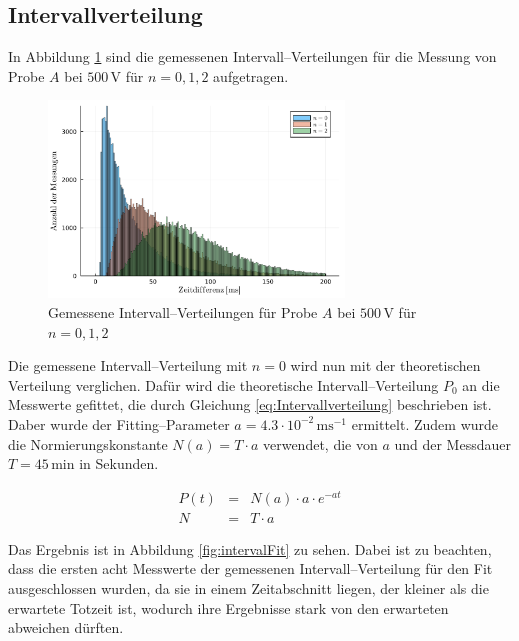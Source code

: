 \documentclass[12pt,a4paper]{scrartcl}
\numberwithin{equation}{section} %
\begin{document}
\hypertarget{intervallverteilung}{%
\subsection{Intervallverteilung}\label{intervallverteilung}}
In Abbildung \ref{fig:interval} sind die gemessenen Intervall--Verteilungen für die Messung von Probe $A$ bei $500 \mathrm{\, V}$ für $n = 0,1,2$ aufgetragen.

\begin{figure}[h]
	\centering
	\includegraphics[width=0.7\textwidth]{../media/B3.1/interval.pdf}
	\caption{Gemessene Intervall--Verteilungen für Probe $A$ bei $500 \mathrm{\, V}$ für $n = 0,1,2$}
	\label{fig:interval}
\end{figure}

Die gemessene Intervall--Verteilung mit $n = 0$ wird nun mit der theoretischen Verteilung verglichen. Dafür wird die theoretische Intervall--Verteilung $P_0$ an die Messwerte gefittet, die durch Gleichung \eqref{eq:Intervallverteilung} beschrieben ist. Daber wurde der Fitting--Parameter $a = 4.3 \cdot 10^{-2} \mathrm{\,ms^{-1}}$ ermittelt. Zudem wurde die Normierungskonstante $N(a)=T\cdot a$ verwendet, die von $a$ und der Messdauer $T=45\mathrm{\,min}$ in Sekunden.

\begin{eqnarray}
	P(t) &=& N(a) \cdot a \cdot e^{-at} \\
	N &=& T \cdot a
\end{eqnarray}

\noindent
Das Ergebnis ist in Abbildung \ref{fig:intervalFit} zu sehen. Dabei ist zu beachten, dass die ersten acht Messwerte der gemessenen Intervall--Verteilung für den Fit ausgeschlossen wurden, da sie in einem Zeitabschnitt liegen, der kleiner als die erwartete Totzeit ist, wodurch ihre Ergebnisse stark von den erwarteten abweichen dürften.
\end{document}

